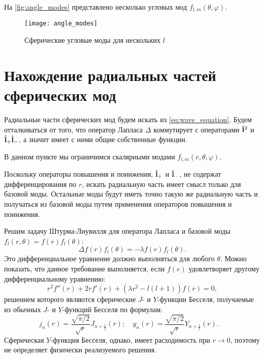 \documentclass[12pt,a4paper]{article}
\begin{document}
        На \autoref{fig:angle_modes} представлено несколько угловых мод $f_{l,m}(\theta,\varphi)$.
        \begin{figure}[h]
            \centering
            \texttt{[image: angle\_modes]}
            \caption[]{Сферические угловые моды для нескольких $l$}
            \label{fig:angle_modes}
        \end{figure}


    \section{Нахождение радиальных частей сферических мод}

        Радиальные части сферических мод будем искать из \autoref{eq:wave_equation}. Будем отталкиваться от того, что оператор Лапласа $\Delta$ коммутирует с операторами $\hat{\mathbf{l}}^2$ и $\hat{\mathbf{l}}_{+} \hat{\mathbf{l}}_{-}$, а значит имеет с ними общие собственные функции.

        В данном пункте мы ограничимся скалярными модами $f_{l,m}(r,\theta,\varphi)$.

        Поскольку операторы повышения и понижения, $\hat{\mathbf{l}}_{+}$ и $\hat{\mathbf{l}}_{-}$, не содержат дифференцирования по $r$, искать радиальную часть имеет смысл только для базовой моды. Остальные моды будут иметь точно такую же радиальную часть и получаться из базовой моды путем применения операторов повышения и понижения.

        Решим задачу Штурма-Лиувилля для оператора Лапласа и базовой моды $f_{l}(r,\theta) = f(r) f_{l}(\theta)$:
        \begin{equation}
            \Delta f(r) f_{l}(\theta) = - \lambda f(r) f_{l}(\theta) .
        \end{equation}
        Это дифференциальное уравнение должно выполняться для любого $\theta$. Можно показать, что данное требование выполняется, если $f(r)$ удовлетворяет другому дифференциальному уравнению:
        \begin{equation}
            r^2 f''(r) + 2 r f'(r) + (\lambda r^2 - l(l+1)) f(r) = 0 ,
        \end{equation}
        решением которого являются сферические $J$- и $Y$-функции Бесселя, получаемые из обычных $J$- и $Y$-функций Бесселя по формулам:
        \begin{equation}
            j_n(r) = \frac{\sqrt{\pi/2}}{\sqrt{r}} J_{n+\frac{1}{2}}(r) ; \quad
            y_n(r) = \frac{\sqrt{\pi/2}}{\sqrt{r}} Y_{n+\frac{1}{2}}(r) . \quad
        \end{equation}
        Сферическая $Y$-функция Бесселя, однако, имеет расходимость при $r \to 0$, поэтому не определяет физически реализуемого решения.
\end{document}
